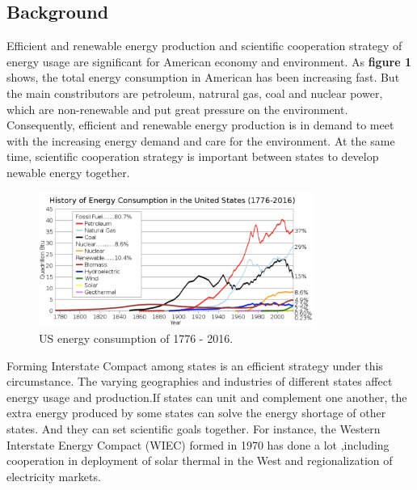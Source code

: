 \documentclass{mcmthesis}
\begin{document}
\subsection{Background}
  Efficient and renewable energy production and scientific cooperation strategy of energy usage are significant for American economy and environment. As \textbf{figure 1 }\cite{Energy} shows, the total energy consumption in American has been increasing fast. But the main constributors are petroleum, natrural gas, coal and nuclear power, which are non-renewable and put great pressure on the environment. Consequently, efficient and renewable energy production is in demand to meet with the increasing energy demand and care for the environment. At the same time, scientific cooperation strategy is important between states to develop newable energy together.
  \begin{figure}[htbp]
    \centering
    \includegraphics[width=0.8\textwidth]{figures//figure1.jpg}
    \caption{US energy consumption of 1776 - 2016.}
  \end{figure}

  Forming Interstate Compact among states is an efficient strategy under this circumstance. The varying geographies and industries of different states affect energy usage and production.If states can unit and complement one another, the extra energy produced by some states can solve the energy shortage of other states. And they can set scientific goals together. For instance, the Western Interstate Energy Compact (WIEC) formed in 1970 has done a lot ,including cooperation in deployment of solar thermal in the West and regionalization of electricity markets\cite{WIEC}.
\end{document}
